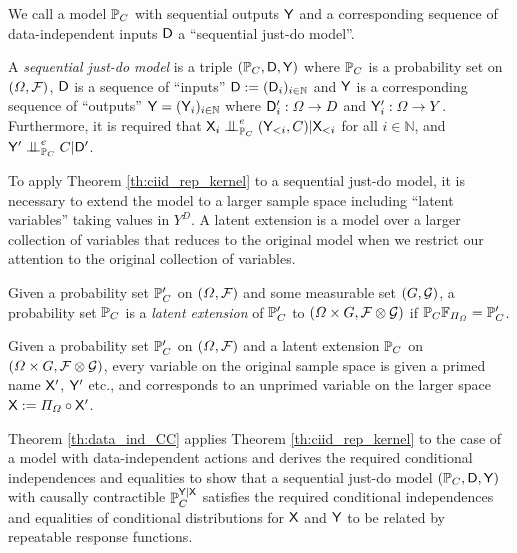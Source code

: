 We call a model $\mathbb{P}_C$ with sequential outputs $\mathsf{Y}$ and a corresponding sequence of data-independent inputs $\mathsf{D}$ a ``sequential just-do model''.

\begin{definition}
A \emph{sequential just-do model} is a triple $(\mathbb{P}_C,\mathsf{D},\mathsf{Y})$ where $\mathbb{P}_C$ is a probability set on $(\Omega,\mathcal{F})$, $\mathsf{D}$ is a sequence of ``inputs'' $\mathsf{D}:=(\mathsf{D}_i)_{i\in\mathbb{N}}$ and $\mathsf{Y}$ is a corresponding sequence of ``outputs'' $\mathsf{Y}=(\mathsf{Y}_i)_{i\in\mathbb{N}}$ where $\mathsf{D}_i':\Omega\to D$ and $\mathsf{Y}_i':\Omega\to Y$. Furthermore, it is required that $\RV{X}_i\CI^e_{\prob{P}_C} (\RV{Y}_{<i},C)|\RV{X}_{<i}$ for all $i\in \mathbb{N}$, and $\RV{Y}'\CI^e_{\prob{P}_C} C|\RV{D}'$.
\end{definition}

To apply Theorem \ref{th:ciid_rep_kernel} to a sequential just-do model, it is necessary to extend the model to a larger sample space including ``latent variables'' taking values in $Y^D$. A latent extension is a model over a larger collection of variables that reduces to the original model when we restrict our attention to the original collection of variables.

\begin{definition}
Given a probability set $\mathbb{P}_C'$ on $(\Omega,\mathcal{F})$ and some measurable set $(G,\mathcal{G})$, a probability set $\mathbb{P}_C$ is a \emph{latent extension} of $\mathbb{P}_C'$ to $(\Omega\times G,\mathcal{F}\otimes \mathcal{G})$ if $\mathbb{P}_C \mathbb{F}_{\Pi_{\Omega}} = \mathbb{P}_C'$.
\end{definition}

\begin{convention}
Given a probability set $\mathbb{P}_C'$ on $(\Omega,\mathcal{F})$ and a latent extension $\mathbb{P}_C$ on $(\Omega\times G,\mathcal{F}\otimes \mathcal{G})$, every variable on the original sample space is given a primed name $\mathsf{X}'$, $\mathsf{Y}'$ etc., and corresponds to an unprimed variable on the larger space $\mathsf{X}:=\Pi_\Omega\circ \mathsf{X}'$.
\end{convention}

Theorem \ref{th:data_ind_CC} applies Theorem \ref{th:ciid_rep_kernel} to the case of a model with data-independent actions and derives the required conditional independences and equalities to show that a sequential just-do model $(\mathbb{P}_C,\mathsf{D},\mathsf{Y})$ with causally contractible $\mathbb{P}_C^{\mathsf{Y}|\mathsf{X}}$ satisfies the required conditional independences and equalities of conditional distributions for $\mathsf{X}$ and $\mathsf{Y}$ to be related by repeatable response functions.

